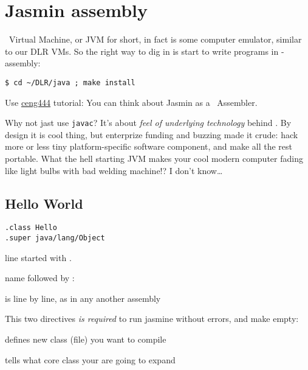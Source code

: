 \section{Jasmin assembly}

\noindent
\J\ Virtual Machine, or JVM for short, in fact is some computer emulator,
similar to our DLR VMs. So the right way to dig in is start to write programs in
\J-assembly:

\begin{lstlisting}
$ cd ~/DLR/java ; make install
\end{lstlisting}
Use
\href{http://saksagan.ceng.metu.edu.tr/courses/ceng444/link/f3jasmintutorial.html}{ceng444} tutorial:
You can think about Jasmin as a \J\ Assembler.

\medskip\noindent
Why not jast use \verb|javac|? It's about \emph{feel of underlying technology}
behind \J. By design it is cool thing, but enterprize funding and buzzing made
it crude: hack more or less tiny platform-specific software component, and make
all the rest portable. What the hell starting JVM makes your cool modern
computer fading like light bulbs with bad welding machine!? I don't know\ldots

\clearpage
\subsection{Hello World}

\begin{lstlisting}[title=java/Hello.j]
.class Hello
.super java/lang/Object
\end{lstlisting}

\begin{description}[nosep]
\item[directive] line started with .
\item[label] name followed by :
\item[instruction] is line by line, as in any another assembly
\end{description}

\medskip\noindent This two directives \emph{is required} to run jasmine without
errors, and make empty:
\begin{description}[nosep]
\item[.class] defines new class (file) you want to compile
\item[.super] tells what core class your are going to expand
\end{description}

